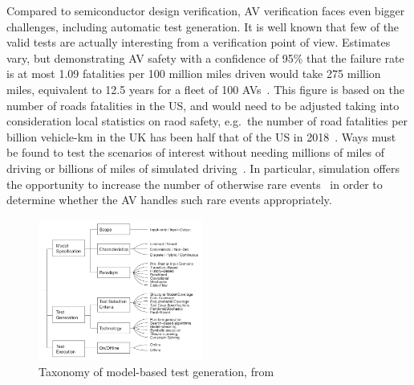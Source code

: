 \documentclass[letterpaper, 10 pt, journal, twoside]{IEEEtran}
\begin{document}
Compared to semiconductor design verification, AV verification faces even bigger challenges, including automatic test generation. 
%
It is well known that few of the valid tests are actually interesting from a verification point of view. 
Estimates vary, but demonstrating AV safety with a confidence of 95\% that the failure rate is at most 1.09 fatalities per 100 million miles driven would take 275 million miles, equivalent to 12.5 years for a fleet of 100 AVs~\cite{kalra2016driving}. %
%
This figure is based on the number of roads fatalities in the US, and would
need to be adjusted taking into consideration local statistics on raod safety,
e.g.\ the number of road fatalities per billion vehicle-km in the UK has been
half that of the US in 2018~\cite{ITFroadSafety2018}.
%
Ways must be found to test the scenarios of interest without needing millions of miles of driving or billions of miles of simulated driving~\cite{korosec2019waymo}.
%
In particular, simulation offers the opportunity to increase the number of otherwise rare events~\cite{Koopman2018} in order to determine whether the AV handles such rare events appropriately. 
%
%


\begin{figure}[!t]
	\centering
\includegraphics[width=0.48\textwidth]{taxonomy.png}
	\caption{Taxonomy of model-based test generation, from~\cite{utting2012taxonomy}}
	\label{taxonomy}
\end{figure}
\end{document}
